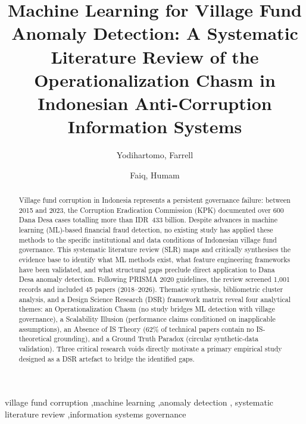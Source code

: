 \documentclass[3p,times,procedia]{elsarticle}
\begin{document}
\begin{frontmatter}


\title{Machine Learning for Village Fund Anomaly Detection: A Systematic Literature Review of the Operationalization Chasm in Indonesian Anti-Corruption Information Systems}

\author[a]{Yodihartomo, Farrell}
\author[b]{Faiq, Humam}
\address[a]{Bina Nusantara University}
\address[b]{Komisi Pemberantasan Korupsi}

\begin{abstract}
Village fund corruption in Indonesia represents a persistent governance failure: between 2015 and 2023, the Corruption Eradication Commission (KPK) documented over 600 Dana Desa cases totalling more than IDR~433 billion. Despite advances in machine learning (ML)-based financial fraud detection, no existing study has applied these methods to the specific institutional and data conditions of Indonesian village fund governance. This systematic literature review (SLR) maps and critically synthesises the evidence base to identify what ML methods exist, what feature engineering frameworks have been validated, and what structural gaps preclude direct application to Dana Desa anomaly detection. Following PRISMA 2020 guidelines, the review screened 1,001 records and included 45 papers (2018--2026). Thematic synthesis, bibliometric cluster analysis, and a Design Science Research (DSR) framework matrix reveal four analytical themes: an Operationalization Chasm (no study bridges ML detection with village governance), a Scalability Illusion (performance claims conditioned on inapplicable assumptions), an Absence of IS Theory (62\% of technical papers contain no IS-theoretical grounding), and a Ground Truth Paradox (circular synthetic-data validation). Three critical research voids directly motivate a primary empirical study designed as a DSR artefact to bridge the identified gaps.
\end{abstract}

\begin{keyword}
village fund corruption \sep machine learning \sep anomaly detection \sep
systematic literature review \sep information systems governance
\end{keyword}

\end{frontmatter}
\end{document}
